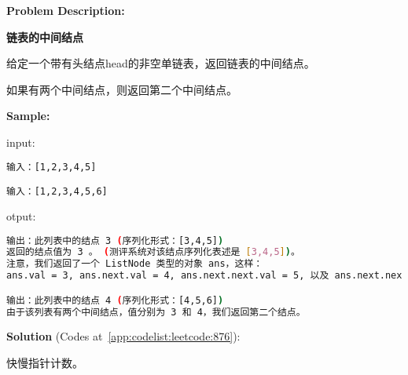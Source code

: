 \textbf{Problem Description:}\par

\textbf{链表的中间结点}\par

给定一个带有头结点head的非空单链表，返回链表的中间结点。\par

如果有两个中间结点，则返回第二个中间结点。\par


\textbf{Sample:}\par

input:\par

\begin{lstlisting}[language=bash]
输入：[1,2,3,4,5]

输入：[1,2,3,4,5,6]
\end{lstlisting}

otput:\par

\begin{lstlisting}[language=bash]
输出：此列表中的结点 3 (序列化形式：[3,4,5])
返回的结点值为 3 。 (测评系统对该结点序列化表述是 [3,4,5])。
注意，我们返回了一个 ListNode 类型的对象 ans，这样：
ans.val = 3, ans.next.val = 4, ans.next.next.val = 5, 以及 ans.next.next.next = NULL.

输出：此列表中的结点 4 (序列化形式：[4,5,6])
由于该列表有两个中间结点，值分别为 3 和 4，我们返回第二个结点。
\end{lstlisting}

\textbf{Solution }(Codes at~\ref{app:codelist:leetcode:876}):\par

快慢指针计数。\par



